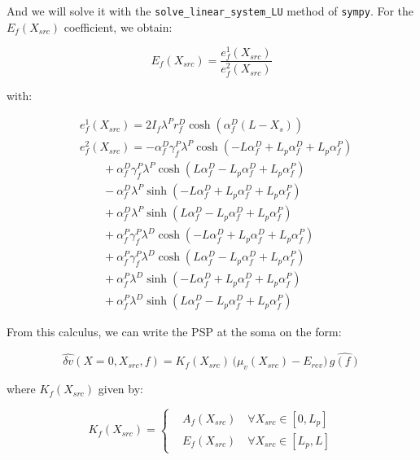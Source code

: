 \documentclass[colorlinks]{article}
\begin{document}
\begin{enumerate}
And we will solve it with the \texttt{solve\_linear\_system\_LU} method of
\texttt{sympy}. For the $E_f(X_{src})$ coefficient, we obtain:

\begin{equation}
E_f(X_{src}) = \frac{e^1_f(X_{src})}{e^2_f(X_{src})}
\end{equation}

with:

\begin{equation}
\begin{split}
& e^1_f(X_{src}) = 2 I_{f} \lambda^{P} r^{D}_{f} \cosh{\left (\alpha^{D}_{f} \left(L - X_{s}\right) \right )} \\
& e^2_f(X_{src}) = - \alpha^{D}_{f} \gamma^{P}_{f} \lambda^{P} \cosh{\left (- L \alpha^{D}_{f} + L_{p} \alpha^{D}_{f} + L_{p} \alpha^{P}_{f} \right )} \\
& \qquad + \alpha^{D}_{f} \gamma^{P}_{f} \lambda^{P} \cosh{\left (L \alpha^{D}_{f} - L_{p} \alpha^{D}_{f} + L_{p} \alpha^{P}_{f} \right )}  \\
& \qquad- \alpha^{D}_{f} \lambda^{P} \sinh{\left (- L \alpha^{D}_{f} + L_{p} \alpha^{D}_{f} + L_{p} \alpha^{P}_{f} \right )}  \\
& \qquad+ \alpha^{D}_{f} \lambda^{P} \sinh{\left (L \alpha^{D}_{f} - L_{p} \alpha^{D}_{f} + L_{p} \alpha^{P}_{f} \right )}  \\
& \qquad+ \alpha^{P}_{f} \gamma^{P}_{f} \lambda^{D} \cosh{\left (- L \alpha^{D}_{f} + L_{p} \alpha^{D}_{f} + L_{p} \alpha^{P}_{f} \right )}  \\
& \qquad+ \alpha^{P}_{f} \gamma^{P}_{f} \lambda^{D} \cosh{\left (L \alpha^{D}_{f} - L_{p} \alpha^{D}_{f} + L_{p} \alpha^{P}_{f} \right )}  \\
& \qquad+ \alpha^{P}_{f} \lambda^{D} \sinh{\left (- L \alpha^{D}_{f} + L_{p} \alpha^{D}_{f} + L_{p} \alpha^{P}_{f} \right )}  \\
& \qquad+ \alpha^{P}_{f} \lambda^{D} \sinh{\left (L \alpha^{D}_{f} - L_{p} \alpha^{D}_{f} + L_{p} \alpha^{P}_{f} \right )}
\end{split}
\end{equation}


From this calculus, we can write the PSP at the soma on the form:

\begin{equation}
\label{eq:delta-v-final}
\hat{\delta v}(X=0, X_{src}, f) = K_f(X_{src}) \, 
\big(\mu_v(X_{src})-E_{rev}\big) \,  \hat{g(f)} 
\end{equation}

where \( K_f(X_{src}) \) given by:

\begin{equation}
K_f(X_{src}) = 
\left\{
\begin{split}
& A_f(X_{src}) \quad \forall X_{src} \in [0,L_p] \\
& E_f(X_{src}) \quad \forall X_{src} \in [L_p, L]
\end{split}
\right.
\end{equation}
\end{enumerate}
\end{document}
